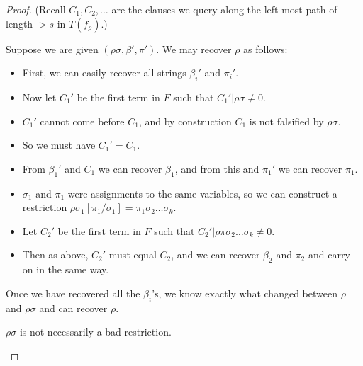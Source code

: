 \begin{proof}
(Recall \( C_1, C_2, \dots \) are the clauses we query along the left-most path of length \( >s \) in \( T(f_{\rho}) \).)
 

Suppose we are given \( (\rho\sigma, \beta', \pi') \). We may recover \( \rho \) as follows:

\begin{itemize}
    \item First, we can easily recover all strings \( \beta_i' \) and \( \pi_i' \).
    \item Now let \( C_1' \) be the first term in \( F \) such that \( C_1' | \rho\sigma \neq 0 \).
    \item \( C_1' \) cannot come before \( C_1 \), and by construction \( C_1 \) is not falsified by \( \rho\sigma \).
    \item So we must have \( C_1' = C_1 \).
    \item From \( \beta_1' \) and \( C_1 \) we can recover \( \beta_1 \), and from this and \( \pi_1' \) we can recover \( \pi_1 \).
    \item \( \sigma_1 \) and \( \pi_1 \) were assignments to the same variables, so we can construct a restriction \( \rho\sigma_1[\pi_1/\sigma_1] = \pi_1\sigma_2 \dots \sigma_k \).
    \item Let \( C_2' \) be the first term in \( F \) such that \( C_2' | \rho\pi\sigma_2 \dots \sigma_k \neq 0 \).
    \item Then as above, \( C_2' \) must equal \( C_2 \), and we can recover \( \beta_2 \) and \( \pi_2 \) and carry on in the same way.
\end{itemize}

\noindent
Once we have recovered all the \( \beta_i \)'s, we know exactly what changed between \( \rho \) and \( \rho\sigma \) and can recover \( \rho \).


\begin{note}
\( \rho\sigma \) is not necessarily a bad restriction.
\end{note}
\end{proof} %


